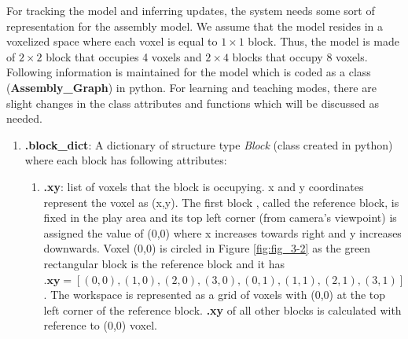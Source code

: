 For tracking the model and inferring updates, the system needs some sort of representation for the assembly model. We assume that the model resides in a voxelized space \parencite{gupta2012duplotrack} where each voxel is equal to $1 \times 1$ block. Thus, the model is made of $2 \times 2$ block  that occupies 4 voxels and $2 \times 4$  blocks that occupy 8 voxels. Following information is maintained for the model which is coded as a class (\textbf{Assembly\_Graph}) in python. For learning and teaching modes, there are slight changes in the class attributes and functions which will be discussed as needed. 
\begin{enumerate}
    \item \textbf{.block\_dict}: A dictionary of structure type \emph{Block} (class created in python) where each block has following attributes:
    \begin{enumerate}
        \item \textbf{.xy}: list of voxels that the block is occupying. x and y coordinates represent the voxel as (x,y). The first block , called the reference block, is fixed in the play area and its top left corner (from camera's viewpoint) is assigned the value of (0,0) where x increases towards right and y increases downwards. Voxel (0,0) is circled in Figure \ref{fig:fig_3-2} as the green rectangular block is the reference block and it has \\
        $\textbf{.xy} = [(0,0), (1,0), (2,0), (3,0), (0,1), (1,1), (2,1), (3,1)]$.  The workspace is represented as a grid of voxels with (0,0) at the top left corner of the reference block. \textbf{.xy} of all other blocks is calculated with reference to (0,0) voxel. 

\end{enumerate}
\end{enumerate}
